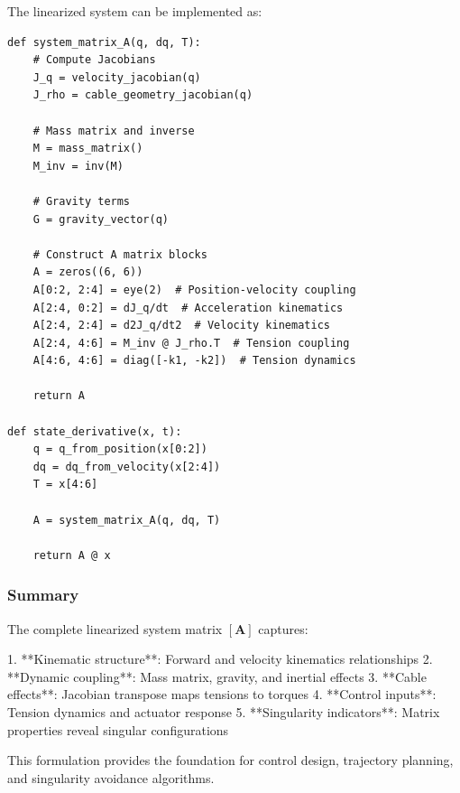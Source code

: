 The linearized system can be implemented as:

\begin{verbatim}
def system_matrix_A(q, dq, T):
    # Compute Jacobians
    J_q = velocity_jacobian(q)
    J_rho = cable_geometry_jacobian(q)
    
    # Mass matrix and inverse
    M = mass_matrix()
    M_inv = inv(M)
    
    # Gravity terms
    G = gravity_vector(q)
    
    # Construct A matrix blocks
    A = zeros((6, 6))
    A[0:2, 2:4] = eye(2)  # Position-velocity coupling
    A[2:4, 0:2] = dJ_q/dt  # Acceleration kinematics
    A[2:4, 2:4] = d2J_q/dt2  # Velocity kinematics
    A[2:4, 4:6] = M_inv @ J_rho.T  # Tension coupling
    A[4:6, 4:6] = diag([-k1, -k2])  # Tension dynamics
    
    return A

def state_derivative(x, t):
    q = q_from_position(x[0:2])
    dq = dq_from_velocity(x[2:4])
    T = x[4:6]
    
    A = system_matrix_A(q, dq, T)
    
    return A @ x
\end{verbatim}

\subsubsection{Summary}

The complete linearized system matrix $[\mathbf{A}]$ captures:

1. **Kinematic structure**: Forward and velocity kinematics relationships
2. **Dynamic coupling**: Mass matrix, gravity, and inertial effects
3. **Cable effects**: Jacobian transpose maps tensions to torques
4. **Control inputs**: Tension dynamics and actuator response
5. **Singularity indicators**: Matrix properties reveal singular configurations

This formulation provides the foundation for control design, trajectory planning, and singularity avoidance algorithms.
